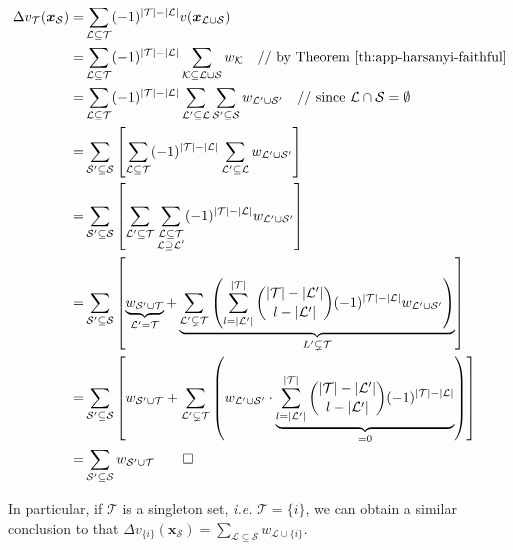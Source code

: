 \begin{small}
\begin{align*}
\Delta v_{\mathcal{T}}(\boldsymbol{x}_{\mathcal{S}})
=& \sum_{\mathcal{L}\subseteq \mathcal{T}}(-1)^{|\mathcal{T}|-|\mathcal{L}|}v(\boldsymbol{x}_{\mathcal{L}\cup\mathcal{S}})\\
=& \sum_{\mathcal{L}\subseteq \mathcal{T}} (-1)^{|\mathcal{T}|-|\mathcal{L}|}\sum_{\mathcal{K}\subseteq \mathcal{L}\cup \mathcal{S}} w_{\mathcal{K}} \quad\text{// by Theorem \ref{th:app-harsanyi-faithful}}\\
=& \sum_{\mathcal{L}\subseteq \mathcal{T}} (-1)^{|\mathcal{T}|-|\mathcal{L}|}\sum_{\mathcal{L}'\subseteq \mathcal{L}}\sum_{\mathcal{S}'\subseteq \mathcal{S}} w_{\mathcal{L}'\cup \mathcal{S}'} \quad\text{// since $\mathcal{L}\cap \mathcal{S}=\emptyset$}\\
=& \sum_{\mathcal{S}'\subseteq \mathcal{S}}\left[\sum_{\mathcal{L}\subseteq \mathcal{T}} (-1)^{|\mathcal{T}|-|\mathcal{L}|} \sum_{\mathcal{L}'\subseteq \mathcal{L}} w_{\mathcal{L}'\cup \mathcal{S}'}\right]\\
=& \sum_{\mathcal{S}'\subseteq \mathcal{S}}\left[\sum_{\mathcal{L}'\subseteq \mathcal{T}}\sum_{\substack{\mathcal{L}\subseteq \mathcal{T}\\ \mathcal{L}\supseteq \mathcal{L}'}}(-1)^{|\mathcal{T}|-|\mathcal{L}|}w_{\mathcal{L}'\cup \mathcal{S}'}\right]\\
=& \sum_{\mathcal{S}'\subseteq \mathcal{S}}\left[\underbrace{w_{\mathcal{S}'\cup \mathcal{T}}}_{\mathcal{L}'=\mathcal{T}} + \underbrace{\sum_{\mathcal{L}'\subsetneq \mathcal{T}}\left(\sum_{l=|\mathcal{L}'|}^{|\mathcal{T}|}\binom{|\mathcal{T}|-|\mathcal{L}'|}{l-|\mathcal{L}'|}(-1)^{|\mathcal{T}|-|\mathcal{L}|}w_{\mathcal{L}'\cup \mathcal{S}'}\right)}_{L'\subsetneq \mathcal{T}}\right]\\
=& \sum_{\mathcal{S}'\subseteq \mathcal{S}}\left[w_{\mathcal{S}'\cup \mathcal{T}} + \sum_{\mathcal{L}'\subsetneq \mathcal{T}}\left(w_{\mathcal{L}'\cup \mathcal{S}'}\cdot\underbrace{\sum_{l=|\mathcal{L}'|}^{|\mathcal{T}|}\binom{|\mathcal{T}|-|\mathcal{L}'|}{l-|\mathcal{L}'|}(-1)^{|\mathcal{T}|-|\mathcal{L}|}}_{=0}\right)\right]\\
=& \sum_{\mathcal{S}'\subseteq \mathcal{S}} w_{\mathcal{S}'\cup \mathcal{T}}
\qed
\end{align*}
\end{small}

In particular, if {\small$\mathcal{T}$} is a singleton set, \emph{i.e.} {\small$\mathcal{T}=\{i\}$}, we can obtain a similar conclusion to \cite{ren2021learning} that {\small$\Delta v_{\{i\}}(\boldsymbol{x}_{\mathcal{S}})=\sum_{\mathcal{L}\subseteq \mathcal{S}} w_{\mathcal{L}\cup\{i\}}$}.


